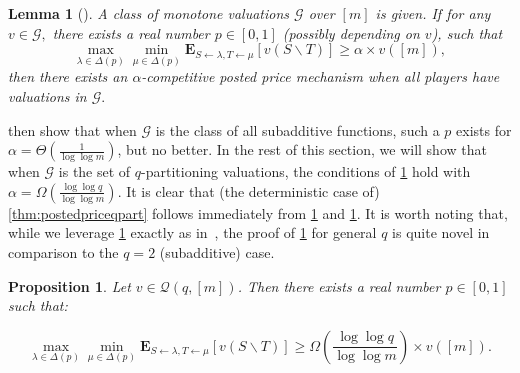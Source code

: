 \documentclass[11pt]{article}%
\newtheorem{lemma}[theorem]{Lemma}
\newtheorem{proposition}[theorem]{Proposition}
\numberwithin{theorem}{subsection}
\newcommand{\expect}{\mathbf{E}}
\begin{document}
\begin{lemma}[{\cite[Eq. (6)]{DuttingKL20}}]
\label{lem:minimaxgame}
A class of monotone valuations $\mathcal{G}$ over $[m]$ is given. If for any $v\in \mathcal{G},$ there exists a real number $p \in [0,1]$ (possibly depending on $v$), such that 
$$
\max_{\lambda\in \Delta(p)}
\min_{\mu \in \Delta(p)}\expect_{S\leftarrow \lambda, T\leftarrow \mu}[v(S\backslash T)]\ge 
\alpha \times v([m]),
$$
then there exists an $\alpha$-competitive posted price mechanism when all players have valuations in $\mathcal{G}.$
\end{lemma}

\cite{DuttingKL20} then show that when $\mathcal{G}$ is the class of all subadditive functions, such a $p$ exists for \linebreak $\alpha = \Theta(\frac{1}{\log \log m})$, but no better. In the rest of this section, we will show that when $\mathcal{G}$ is the set of $q$-partitioning valuations, the conditions of 
\cref{lem:minimaxgame} hold with $\alpha = \Omega \left(\frac{\log \log q}{\log \log m}\right)$. It is clear that (the deterministic case of) \cref{thm:postedpriceqpart} follows immediately from \cref{lem:minimaxgame} and \cref{prop:qpartprobexists}. It is worth noting that, while we leverage \cref{lem:minimaxgame} exactly as in~\cite{DuttingKL20}, the proof of \cref{prop:qpartprobexists} for general $q$ is quite novel in comparison to the $q=2$ (subadditive) case.

\begin{proposition}\label{prop:qpartprobexists} Let $v \in \mathcal{Q}(q,[m])$. Then there exists a real number $p\in [0,1]$ such that:

$$\max_{\lambda\in \Delta(p)}
\min_{\mu \in \Delta(p)}\expect_{S\leftarrow \lambda, T\leftarrow \mu}[v(S\backslash T)]\ge
\Omega \left(\frac{\log \log q}{\log \log m}\right)\times v([m]).$$
\end{proposition}
\end{document}
